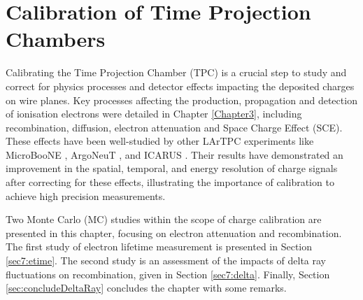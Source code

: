 
\chapter{Calibration of Time Projection Chambers}
\label{ChapterCalib}
\ifpdf
    \graphicspath{{Chapter8/Figs/Raster/}{Chapter8/Figs/PDF/}{Chapter8/Figs/}}
\else
    \graphicspath{{Chapter8/Figs/Vector/}{Chapter8/Figs/}}
\fi

Calibrating the Time Projection Chamber (TPC) is a crucial step to study and correct for physics processes and detector effects impacting the deposited charges on wire planes.
Key processes affecting the production, propagation and detection of ionisation electrons were detailed in Chapter \ref{Chapter3}, including recombination, diffusion, electron attenuation and Space Charge Effect (SCE).
These effects have been well-studied by other LArTPC experiments like MicroBooNE \cite{uboone_calib, ubooneEtime}, ArgoNeuT \cite{argoneut_recomb}, and ICARUS \cite{icarus_recomb, GrayDiffusion}.
Their results have demonstrated an improvement in the spatial, temporal, and energy resolution of charge signals after correcting for these effects, illustrating the importance of calibration to achieve high precision measurements.

Two Monte Carlo (MC) studies within the scope of charge calibration are presented in this chapter, focusing on electron attenuation and recombination.
The first study of electron lifetime measurement is presented in Section \ref{sec7:etime}.
The second study is an assessment of the impacts of delta ray fluctuations on recombination, given in Section \ref{sec7:delta}.
Finally, Section \ref{sec:concludeDeltaRay} concludes the chapter with some remarks.



